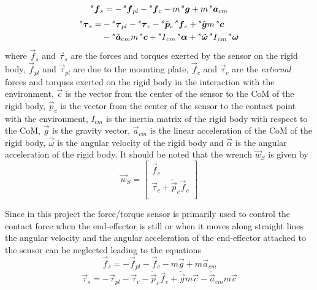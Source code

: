 \begin{equation}
  \prescript{s}{}{ \vec{f}}_{s} = -\prescript{s}{}{ \vec{f}}_{pl} -\prescript{s}{}{ \vec{f}}_{c} -m \prescript{s}{}{ \vec{g}}
  + m \prescript{s}{}{ \vec{a}}_{cm}
\end{equation}
\begin{equation}\label{eq:ne_torque_1}
  \begin{split}
  \prescript{s}{}{ \vec{\tau}}_{s} =& -\prescript{s}{}{ \vec{\tau}}_{pl} -\prescript{s}{}{ \vec{\tau}}_{c}
  - \prescript{s}{}{ \tilde{\vec{p}}}_{c} \prescript{s}{}{ \vec{f}}_{c}
  + \prescript{s}{}{ \tilde{\vec{g}}} m\prescript{s}{}{\vec{c}} \\
  & - \prescript{s}{}{ \tilde{\vec{a}}}_{cm} m \prescript{s}{}{ \vec{c}}
  + \prescript{s}{}{ I}_{cm} \prescript{s}{}{\vec{\alpha}}
  + \prescript{s}{}{ \tilde{\vec{\omega}}} \prescript{s}{}{ I}_{cm} \prescript{s}{}{ \vec{\omega}}\\
  \end{split}
\end{equation}
where
$\vec{f}_{s}$ and $\vec{\tau}_{s}$ are the forces and torques exerted by the sensor on the rigid body,
$\vec{f}_{pl}$ and $\vec{\tau}_{pl}$ are due to the mounting plate,
$\vec{f}_{c}$ and $\vec{\tau}_{c}$ are the \emph{external} forces and torques exerted on the rigid body in the interaction
with the environment,
$\vec{c}$ is the vector from the center of the sensor to the CoM of the rigid body,
$\vec{p}_{c}$ is the vector from the center of the sensor to the contact point with the environment,
$I_{cm}$ is the inertia matrix of the rigid body with respect to the CoM,
$\vec{g}$ is the gravity vector, $\vec{a}_{cm}$ is the linear acceleration of the CoM of the rigid body,
$\vec{\omega}$ is the angular velocity of the rigid body and
$\vec{\alpha}$ is the angular acceleration of the rigid body.
It should be noted that the wrench $\vec{w}_{S}$  is given by
\[
\vec{w}_{S} =
\begin{bmatrix}
  \vec{f}_{c}\\
  \vec{\tau}_{c} +\tilde{\vec{p}}_{c} \vec{f}_{c}\\
\end{bmatrix}
\]
\par
Since in this project the force/torque sensor is primarily used to control the contact force when the end-effector
is still or when it moves along straight lines the angular velocity and the angular acceleration of the end-effector
attached to the sensor can be neglected leading to the equations
\begin{equation}
  \label{eq:ne_force_2}
   \vec{f}_{s} = - \vec{f}_{pl} - \vec{f}_{c} -m  \vec{g} + m  \vec{a}_{cm}
\end{equation}
\begin{equation}
  \label{eq:ne_torque_2}
   \vec{\tau}_{s} = - \vec{\tau}_{pl} - \vec{\tau}_{c} - \tilde{\vec{p}}_{c}  \vec{f}_{c}
   + \tilde{\vec{g}} m\vec{c} -  \tilde{\vec{a}}_{cm} m  \vec{c}
\end{equation}

